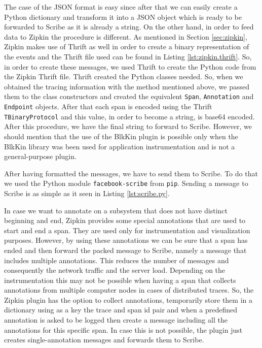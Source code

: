 The case of the JSON format is easy since after that we can easily create a
Python dictionary and transform it into a JSON object which is ready to be
forwarded to Scribe as it is already a string. On the other hand, in order to
feed data to Zipkin the procedure is different. As mentioned in Section
\ref{sec:zipkin}, Zipkin makes use of Thrift as well in order to create a binary
representation of the events and the Thrift file used can be found in Listing
\ref{lst:zipkin.thrift}. So, in order to create these messages, we used Thrift
to create the Python code from the Zipkin Thrift file. Thrift created the Python
classes needed. So, when we obtained the tracing information with the method
mentioned above, we passed them to the class constructors and created the
equivalent \texttt{Span}, \texttt{Annotation} and \texttt{Endpoint} objects.
After that each span is encoded using the Thrift \texttt{TBinaryProtocol} and
this value, in order to become a string, is base64 encoded. After this
procedure, we have the final string to forward to Scribe. However, we should
mention that the use of the BlkKin plugin is possible only when the BlkKin
library was been used for application instrumentation and is not a
general-purpose plugin.

After having formatted the messages, we have to send them to Scribe. To do that
we used the Python module \texttt{facebook-scribe} from \texttt{pip}. Sending a
message to Scribe is as simple as it seen in Listing \ref{lst:scribe.py}.


In case we want to annotate on a subsystem that does not have distinct beginning
and end, Zipkin provides some special annotations that are used to start and end
a span. They are used only for instrumentation and visualization purposes.
However, by using these annotations we can be sure that a span has
ended and then forward the packed message to Scribe, namely a message that
includes multiple annotations. This reduces the number of messages and
consequently the network traffic and the server load. Depending on the
instrumentation this may not be possible when having a span that collects
annotations from multiple computer nodes in cases of distributed traces. So, the
Zipkin plugin has the option to collect annotations, temporarily store them in
a dictionary using as a key the trace and span id pair and when a predefined
annotation is asked to be logged then create a message including all the
annotations for this specific span. In case this is not possible, the plugin
just creates single-annotation messages and forwards them to Scribe.

